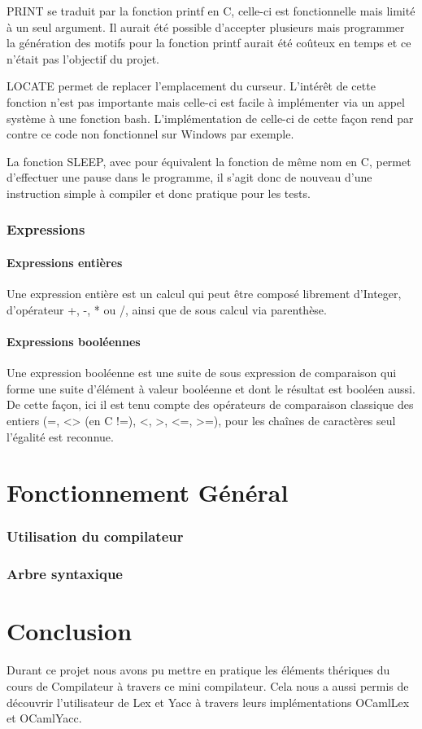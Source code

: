\documentclass[french]{article}
\begin{document}
PRINT se traduit par la fonction printf en C, celle-ci est fonctionnelle mais limité à un seul argument. Il aurait été possible d'accepter plusieurs mais programmer la génération des motifs pour la fonction printf aurait été coûteux en temps et ce n'était pas l'objectif du projet.

LOCATE permet de replacer l'emplacement du curseur. L'intérêt de cette fonction n'est pas importante mais celle-ci est facile à implémenter via un appel système à une fonction bash. L'implémentation de celle-ci de cette façon rend par contre ce code non fonctionnel sur Windows par exemple.

La fonction SLEEP, avec pour équivalent la fonction de même nom en C, permet d'effectuer une pause dans le programme, il s'agit donc de nouveau d'une instruction simple à compiler et donc pratique pour les tests.

\section{Expressions}
\subsection{Expressions entières}
\label{ssec:expr-entiere}
Une expression entière est un calcul qui peut être composé librement d'Integer, d'opérateur +, -, * ou /, ainsi que de sous calcul via parenthèse.

\subsection{Expressions booléennes}
\label{ssec:expr-booleenne}

Une expression booléenne est une suite de sous expression de comparaison qui forme une suite d'élément à valeur booléenne et dont le résultat est booléen aussi. De cette façon, ici il est tenu compte des opérateurs de comparaison classique des entiers (=, <> (en C !=), <, >, <=, >=), pour les chaînes de caractères seul l'égalité est reconnue.

\part{Fonctionnement Général}
\section{Utilisation du compilateur}
\section{Arbre syntaxique}

\part{Conclusion}

Durant ce projet nous avons pu mettre en pratique les éléments thériques du cours de Compilateur à travers ce mini compilateur. Cela nous a aussi permis de découvrir l'utilisateur de Lex et Yacc à travers leurs implémentations OCamlLex et OCamlYacc.
\end{document}
